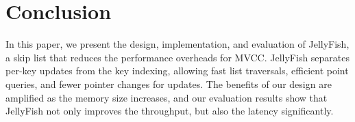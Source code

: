 \section{Conclusion}
In this paper, we present the design, implementation, and evaluation of JellyFish, 
a skip list that reduces the performance overheads for MVCC.
JellyFish separates per-key updates from the key indexing, 
allowing fast list traversals, efficient point queries, and fewer pointer changes for updates.
The benefits of our design are amplified as the memory size increases, 
and our evaluation results show that JellyFish not only improves the throughput,
but also the latency significantly.

